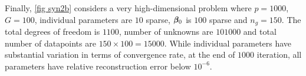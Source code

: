 	
Finally, \cref{fig syn2b} considers a very high-dimensional problem where $p=1000$, $G=100$, individual parameters are $10$ sparse, $\boldsymbol{\beta}_0$ is $100$ sparse and $n_g=150$. The total degrees of freedom is $1100$, number of unknowns are $101000$ and total number of datapoints are $150\times 100=15000$. While individual parameters have substantial variation in terms of convergence rate, at the end of $1000$ iteration, all parameters have relative reconstruction error below $10^{-6}$.
%			
%			
%	
%			
%			



